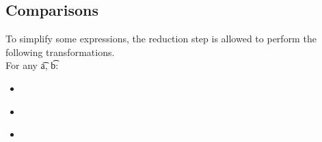 \subsection{Comparisons}
To simplify some expressions, the reduction step is allowed to perform the following transformations.\\
For any \t{a}, \t{b}:
\begin{itemize}
    \item {} \to\ 
    \item {} \to\ 
    \item {} \to\ 
\end{itemize}


